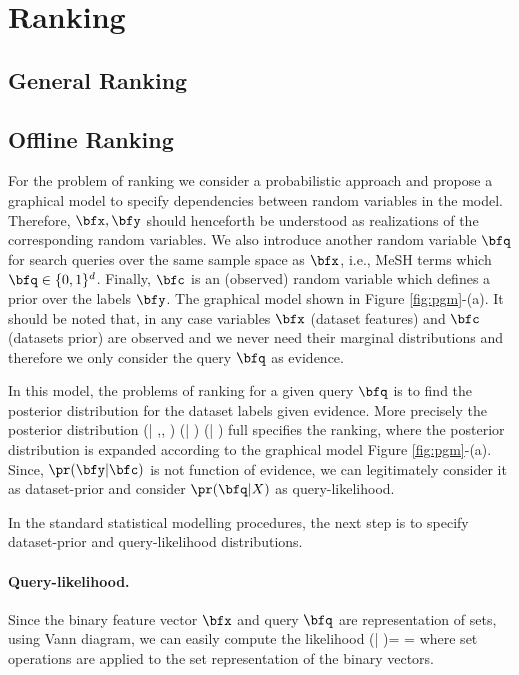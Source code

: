 \documentclass[twoside,11pt]{article}
\begin{document}
\section{Ranking}
\subsection{General Ranking}

\subsection{Offline Ranking}
For the problem of ranking we consider a probabilistic approach and propose a graphical model to specify dependencies between random variables in the model. Therefore, $\bfx, \bfy$ should henceforth be understood as realizations of the corresponding random variables.
We also introduce another random variable $\bfq$ for search queries over the same sample space as $\bfx$, i.e., MeSH terms which $\bfq \in\{0,1\}^{d}$.  Finally, $\bfc$ is an (observed) random variable which defines a prior over the labels $\bfy$.
The graphical model shown in Figure \ref{fig:pgm}-(a). It should be noted that, in any case variables $\bfx$ (dataset features) and $\bfc$ (datasets prior) are observed and we never need their marginal distributions and therefore we only consider the query $\bfq$ as evidence.

In this model, the problems of ranking for a given query $\bfq$ is to find the posterior distribution for the dataset labels given evidence. More precisely the posterior distribution
\beq
\pr(\bfy | \bfq,\bfc, \bfx) \propto \pr(\bfy | \bfc ) \pr(\bfq | \bfx)
\eeq
full specifies the ranking, where the posterior distribution is expanded according to the graphical model Figure \ref{fig:pgm}-(a). 
Since, $\pr(\bfy | \bfc )$  is not function of evidence, we can legitimately consider it as dataset-prior and consider $\pr(\bfq | X)$ as query-likelihood.

In the standard statistical modelling procedures, the next step is to specify dataset-prior and query-likelihood distributions.

\paragraph{Query-likelihood.} Since the binary feature vector $\bfx$ and query $\bfq$ are representation of sets, using Vann diagram, we can easily compute the likelihood
\beq
\pr(\bfq | \bfx)= \frac{\pr(\bfq , \bfx)}{\pr(\bfx)} = \frac{|\bfq \cap \bfx|}{|\bfx|}
\eeq
where set operations are applied to the set representation of the binary vectors.
\end{document}
